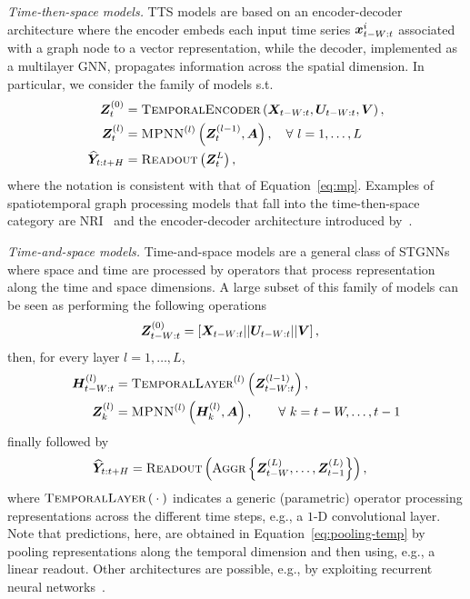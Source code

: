 \textit{Time-then-space models.} TTS models are based on an encoder-decoder architecture where the encoder embeds each input time series ${\bm{x}}^i_{t-W:t}$ associated with a graph node to a vector representation, while the decoder, implemented as a multilayer GNN, propagates information across the spatial dimension. In particular, we consider the family of models s.t.\
\begin{align}
    {\bm{Z}}^{(0)}_t &= \textsc{TemporalEncoder}\left({\bm{X}}_{t-W:t}, {\bm{U}}_{t-W:t}, {\bm{V}}\right),\\  
    {{\bm{Z}}}^{(l)}_t &= \textsc{MPNN}^{(l)}\left({\bm{Z}}_t^{(l-1)}, {\bm{A}}\right),  \quad \forall\ l=1,\dots,L\\
    \widehat {{\bm{Y}}}_{t:t+H} &= \textsc{Readout}\left( {\bm{Z}}^{L}_{t} \right),
    \label{eq:tts}
\end{align}
where the notation is consistent with that of Equation~\eqref{eq:mp}. Examples of spatiotemporal graph processing models that fall into the time-then-space category are NRI~\citep{kipf2018neural} and the encoder-decoder architecture introduced by~\citet{satorras2022multivariate}.

\textit{Time-and-space models.} Time-and-space models are a  general class of STGNNs where space and time are processed by operators that process representation along the time and space dimensions. A large subset of this family of models can be seen as performing the following operations
\begin{align}
    {\bm{Z}}_{t-W:t}^{(0)} &= \left[{\bm{X}}_{t-W:t} || {\bm{U}}_{t-W:t} || {\bm{V}}\right],
\end{align}
then, for every layer $l=1,\dots,L$,
\begin{align}
    {\bm{H}}^{(l)}_{t-W:t} &= \textsc{TemporalLayer}^{(l)}\left({\bm{Z}}^{(l-1)}_{t-W:t}\right),\\ 
    {{\bm{Z}}}^{(l)}_{k} &= \textsc{MPNN}^{(l)}\left({\bm{H}}_{k}^{(l)}, {\bm{A}}\right),  \qquad \forall\ k=t-W,\dots,t-1\label{eq:stgnn-tts}
\end{align}
finally followed by 
\begin{align}
    \label{eq:pooling-temp}
    \widehat {{\bm{Y}}}_{t:t+H} &= \textsc{Readout}\left( {\textsc{Aggr}}\left\{ {{\bm{Z}}}^{(L)}_{t-W}, \dots, {{\bm{Z}}}^{(L)}_{t-1}\right\} \right),
\end{align}
where $\textsc{TemporalLayer}\left({}\cdot{}\right)$ indicates a generic (parametric) operator processing representations across the different time steps, e.g., a $1$-D convolutional layer.
Note that predictions, here, are obtained in Equation~\eqref{eq:pooling-temp} by pooling representations along the temporal dimension and then using, e.g., a linear readout. Other architectures are possible, e.g., by exploiting recurrent neural networks~\citep{seo2018structured, li2018diffusion}.

